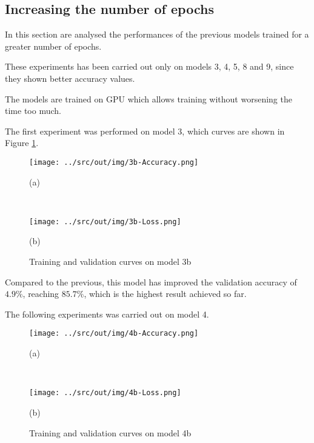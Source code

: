 \documentclass[a4paper,12pt]{article} %
\begin{document}
	\subsection{Increasing the number of epochs}
	\label{subsection:epochs}
	In this section are analysed the performances of the previous models 
	trained for a greater number of epochs. 
	
	These experiments has been carried out only on models 3, 4, 5, 8 and 9, 
	since they shown better accuracy values. 
	
	The models are trained on GPU which allows training without worsening the 
	time too much.
	\newline
	
	The first experiment was performed on model 3, which curves are shown in 
	Figure \ref{fig:model3b-performance}. 
		
	\begin{figure}[htb]
		\begin{minipage}[c]{.49\textwidth}
			\centering
			\texttt{[image: ../src/out/img/3b-Accuracy.png]}
			\caption*{(a)}
		\end{minipage}
		~
		\begin{minipage}[c]{.49\textwidth}
			\centering
			\texttt{[image: ../src/out/img/3b-Loss.png]}
			\caption*{(b)}
		\end{minipage}
		\caption{Training and validation curves on model 3b}
		\label{fig:model3b-performance}
	\end{figure}

 	Compared to the previous, this model has improved the validation accuracy 
 	of $4.9\%$, reaching $85.7\%$, which is the highest result achieved so far.
	\newline
	
	The following experiments was carried out on model 4. 
		
	\begin{figure}[H]
		\begin{minipage}[c]{.49\textwidth}
			\centering
			\texttt{[image: ../src/out/img/4b-Accuracy.png]}
			\caption*{(a)}
		\end{minipage}
		~
		\begin{minipage}[c]{.49\textwidth}
			\centering
			\texttt{[image: ../src/out/img/4b-Loss.png]}
			\caption*{(b)}
		\end{minipage}
		\caption{Training and validation curves on model 4b}
		\label{fig:model4b-performance}
	\end{figure}
\end{document}
